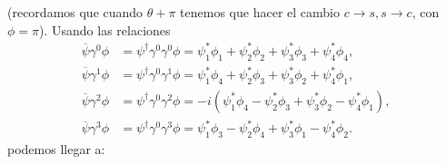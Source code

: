 (recordamos que cuando $\theta+\pi$ tenemos que hacer el cambio $c \to s, s \to c$, con $\phi=\pi$). Usando las relaciones \cite{SaboridoSilva2025ParticlePhysicsI,thomson_modern_physics}
\begin{align}
	\overline{\psi}\gamma^0\phi & = \psi^\dagger \gamma^0 \gamma^0 \phi
	= \psi_1^*\phi_1 + \psi_2^*\phi_2 + \psi_3^*\phi_3 + \psi_4^*\phi_4,     \\
	\overline{\psi}\gamma^1\phi & = \psi^\dagger \gamma^0 \gamma^1 \phi
	= \psi_1^*\phi_4 + \psi_2^*\phi_3 + \psi_3^*\phi_2 + \psi_4^*\phi_1,     \\
	\overline{\psi}\gamma^2\phi & = \psi^\dagger \gamma^0 \gamma^2 \phi
	= -i(\psi_1^*\phi_4 - \psi_2^*\phi_3 + \psi_3^*\phi_2 - \psi_4^*\phi_1), \\
	\overline{\psi}\gamma^3\phi & = \psi^\dagger \gamma^0 \gamma^3 \phi
	= \psi_1^*\phi_3 - \psi_2^*\phi_4 + \psi_3^*\phi_1 - \psi_4^*\phi_2.
\end{align}
podemos llegar a: 

